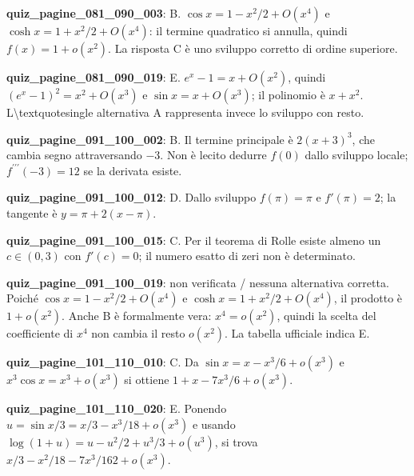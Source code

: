 \documentclass[11pt,a4paper]{article}
\newcounter{quiz}
\begin{document}
\noindent\textbf{quiz\_pagine\_081\_090\_003}: B. $\cos x=1-x^2/2+O(x^4)$ e $\cosh x=1+x^2/2+O(x^4)$: il termine quadratico si annulla, quindi $f(x)=1+o(x^2)$. La risposta C è uno sviluppo corretto di ordine superiore.\par\medskip
\noindent\textbf{quiz\_pagine\_081\_090\_019}: E. $e^x-1=x+O(x^2)$, quindi $(e^x-1)^2=x^2+O(x^3)$ e $\sin x=x+O(x^3)$; il polinomio è $x+x^2$. L\textbackslash{}textquotesingle alternativa A rappresenta invece lo sviluppo con resto.\par\medskip
\noindent\textbf{quiz\_pagine\_091\_100\_002}: B. Il termine principale è $2(x+3)^3$, che cambia segno attraversando $-3$. Non è lecito dedurre $f(0)$ dallo sviluppo locale; $f^{\prime\prime\prime}(-3)=12$ se la derivata esiste.\par\medskip
\noindent\textbf{quiz\_pagine\_091\_100\_012}: D. Dallo sviluppo $f(\pi)=\pi$ e $f\prime(\pi)=2$; la tangente è $y=\pi+2(x-\pi)$.\par\medskip
\noindent\textbf{quiz\_pagine\_091\_100\_015}: C. Per il teorema di Rolle esiste almeno un $c\in(0,3)$ con $f\prime(c)=0$; il numero esatto di zeri non è determinato.\par\medskip
\noindent\textbf{quiz\_pagine\_091\_100\_019}: non verificata / nessuna alternativa corretta. Poiché $\cos x=1-x^2/2+O(x^4)$ e $\cosh x=1+x^2/2+O(x^4)$, il prodotto è $1+o(x^2)$. Anche B è formalmente vera: $x^4=o(x^2)$, quindi la scelta del coefficiente di $x^4$ non cambia il resto $o(x^2)$. La tabella ufficiale indica E.\par\medskip
\noindent\textbf{quiz\_pagine\_101\_110\_010}: C. Da $\sin x=x-x^3/6+o(x^3)$ e $x^3\cos x=x^3+o(x^3)$ si ottiene $1+x-7x^3/6+o(x^3)$.\par\medskip
\noindent\textbf{quiz\_pagine\_101\_110\_020}: E. Ponendo $u=\sin x/3=x/3-x^3/18+o(x^3)$ e usando $\log(1+u)=u-u^2/2+u^3/3+o(u^3)$, si trova $x/3-x^2/18-7x^3/162+o(x^3)$.\par\medskip
\end{document}
